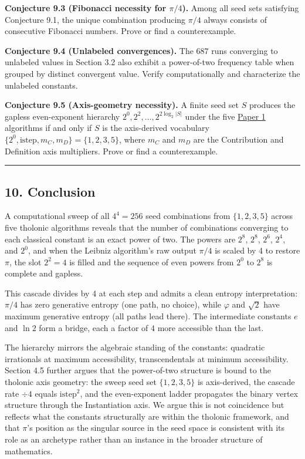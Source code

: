\documentclass[
  11pt,
  letterpaper,
]{article}
\begin{document}
\textbf{Conjecture 9.3 (Fibonacci necessity for \(\pi/4\)).} Among all
seed sets satisfying Conjecture 9.1, the unique combination producing
\(\pi/4\) always consists of consecutive Fibonacci numbers. Prove or
find a counterexample.

\textbf{Conjecture 9.4 (Unlabeled convergences).} The 687 runs
converging to unlabeled values in Section 3.2 also exhibit a
power-of-two frequency table when grouped by distinct convergent value.
Verify computationally and characterize the unlabeled constants.

\textbf{Conjecture 9.5 (Axis-geometry necessity).} A finite seed set
\(S\) produces the gapless even-exponent hierarchy
\(2^0, 2^2, \ldots, 2^{2\log_2|S|}\) under the five
\href{https://github.com/baardev/truevalue/blob/main/docnav/Research/papers/1_recursive-tholonic-five-constants/1_recursive-tholonic-five-constants.pdf}{Paper
1} algorithms if and only if \(S\) is the axis-derived vocabulary
\(\{2^0, \mathrm{istep}, m_C, m_D\} = \{1, 2, 3, 5\}\), where \(m_C\)
and \(m_D\) are the Contribution and Definition axis multipliers. Prove
or find a counterexample.

\begin{center}\rule{0.5\linewidth}{0.5pt}\end{center}

\subsection{10. Conclusion}\label{conclusion}

A computational sweep of all \(4^4 = 256\) seed combinations from
\(\{1, 2, 3, 5\}\) across five tholonic algorithms reveals that the
number of combinations converging to each classical constant is an exact
power of two. The powers are \(2^8\), \(2^8\), \(2^6\), \(2^4\), and
\(2^0\), and when the Leibniz algorithm's raw output \(\pi/4\) is scaled
by 4 to restore \(\pi\), the slot \(2^2 = 4\) is filled and the sequence
of even powers from \(2^0\) to \(2^8\) is complete and gapless.

This cascade divides by 4 at each step and admits a clean entropy
interpretation: \(\pi/4\) has zero generative entropy (one path, no
choice), while \(\varphi\) and \(\sqrt{2}\) have maximum generative
entropy (all paths lead there). The intermediate constants \(e\) and
\(\ln 2\) form a bridge, each a factor of 4 more accessible than the
last.

The hierarchy mirrors the algebraic standing of the constants: quadratic
irrationals at maximum accessibility, transcendentals at minimum
accessibility. Section 4.5 further argues that the power-of-two
structure is bound to the tholonic axis geometry: the sweep seed set
\(\{1, 2, 3, 5\}\) is axis-derived, the cascade rate \(\div 4\) equals
\(\mathrm{istep}^2\), and the even-exponent ladder propagates the binary
vertex structure through the Instantiation axis. We argue this is not
coincidence but reflects what the constants structurally are within the
tholonic framework, and that \(\pi\)'s position as the singular source
in the seed space is consistent with its role as an archetype rather
than an instance in the broader structure of mathematics.
\end{document}
